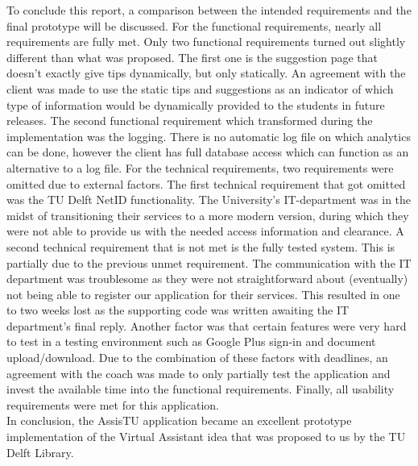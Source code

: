 To conclude this report, a comparison between the intended requirements and the final prototype will be discussed. For the functional requirements, nearly all requirements are fully met. Only two functional requirements turned out slightly different than what was proposed. The first one is the suggestion page that doesn't exactly give tips dynamically, but only statically. An agreement with the client was made to use the static tips and suggestions as an indicator of which type of information would be dynamically provided to the students in future releases. The second functional requirement which transformed during the implementation was the logging. There is no automatic log file on which analytics can be done, however the client has full database access which can function as an alternative to a log file. For the technical requirements, two requirements were omitted due to external factors. The first technical requirement that got omitted was the TU Delft NetID functionality. The University's IT-department was in the midst of transitioning their services to a more modern version, during which they were not able to provide us with the needed access information and clearance. A second technical requirement that is not met is the fully tested system. This is partially due to the previous unmet requirement. The communication with the IT department was troublesome as they were not straightforward about (eventually) not being able to register our application for their services. This resulted in one to two weeks lost as the supporting code was written awaiting the IT department's final reply. Another factor was that certain features were very hard to test in a testing environment such as Google Plus sign-in and document upload/download. Due to the combination of these factors with deadlines, an agreement with the coach was made to only partially test the application and invest the available time into the functional requirements. Finally, all usability requirements were met for this application. \\

In conclusion, the AssisTU application became an excellent prototype implementation of the Virtual Assistant idea that was proposed to us by the TU Delft Library.